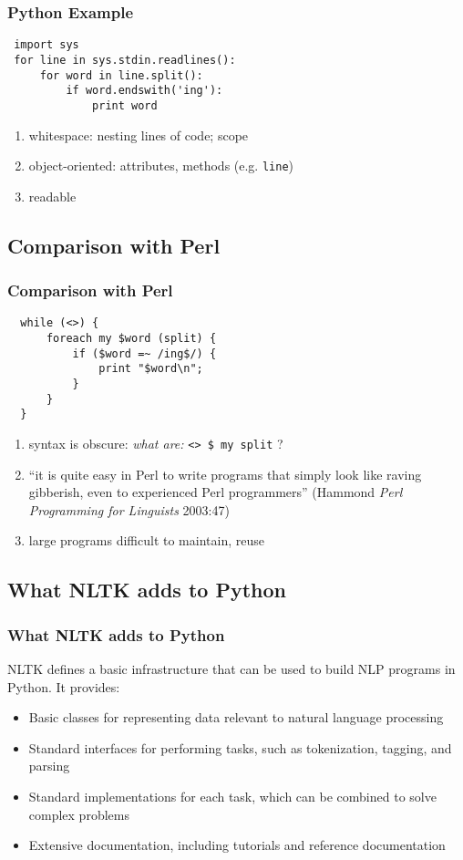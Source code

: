 \documentclass{beamer}             %
\begin{document}
\begin{frame}[fragile]
  \frametitle{Python Example}

\begin{verbatim}
 import sys
 for line in sys.stdin.readlines():
     for word in line.split():
         if word.endswith('ing'):
             print word
\end{verbatim}

\begin{enumerate}
\item whitespace: nesting lines of code; scope
\item object-oriented: attributes, methods (e.g. \texttt{line})
\item readable
\end{enumerate}
\end{frame}

\subsection{Comparison with Perl}
\begin{frame}[fragile]
\frametitle{Comparison with Perl}

\begin{verbatim}
  while (<>) {
      foreach my $word (split) {
          if ($word =~ /ing$/) {
              print "$word\n";
          }
      }
  }
\end{verbatim}

\begin{enumerate}
\item syntax is obscure: \textit{what are:} \verb|<> $ my split| ?
\item ``it is quite easy in Perl to write programs that simply
  look like raving gibberish, even to experienced Perl programmers''
  (Hammond \textit{Perl Programming for Linguists} 2003:47)
\item large programs difficult to maintain, reuse
\end{enumerate}
\end{frame}

\subsection{What NLTK adds to Python}
\begin{frame}
\frametitle{What NLTK adds to Python}

NLTK defines a basic infrastructure that can be used to build NLP
programs in Python.  It provides:

\begin{itemize}
\item Basic classes for representing data relevant to natural language
  processing
\item Standard interfaces for performing tasks, such
  as tokenization, tagging, and parsing
\item Standard implementations for each task, which
  can be combined to solve complex problems
\item Extensive documentation, including tutorials
  and reference documentation
\end{itemize}
\end{frame}
\end{document}
